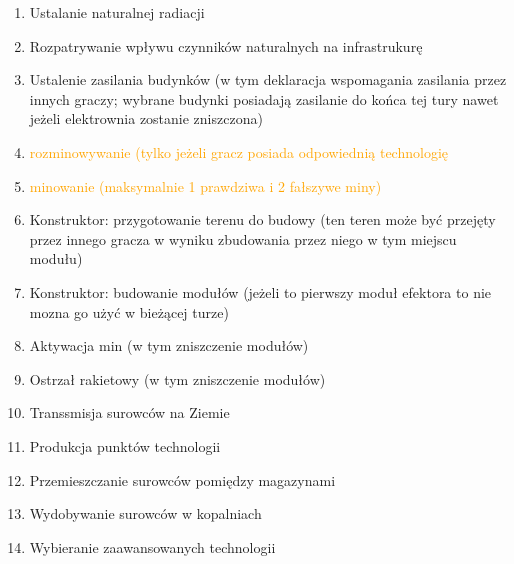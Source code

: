 \documentclass[11pt,a4paper]{article}
\begin{document}
\begin{enumerate}
  \setlength{\parskip}{0pt}
  \setlength{\itemsep}{0pt plus 1pt}
\item Ustalanie naturalnej radiacji
\item Rozpatrywanie wpływu czynników naturalnych na infrastrukurę
\item Ustalenie zasilania budynków (w tym deklaracja wspomagania zasilania przez innych graczy; wybrane budynki posiadają zasilanie do końca tej tury nawet jeżeli elektrownia zostanie zniszczona)
\item \textcolor{orange}{rozminowywanie (tylko jeżeli gracz posiada odpowiednią technologię}
\item \textcolor{orange}{minowanie (maksymalnie 1 prawdziwa i 2 fałszywe miny)}
\item Konstruktor: przygotowanie terenu do budowy (ten teren może być przejęty przez innego gracza w wyniku zbudowania przez niego w tym miejscu modułu)
\item Konstruktor: budowanie modułów (jeżeli to pierwszy moduł efektora to nie mozna go użyć w bieżącej turze)
\item Aktywacja min (w tym zniszczenie modułów)
\item Ostrzał rakietowy (w tym zniszczenie modułów)
\item Transsmisja surowców na Ziemie
\item Produkcja punktów technologii
\item Przemieszczanie surowców pomiędzy magazynami
\item Wydobywanie surowców w kopalniach
\item Wybieranie zaawansowanych technologii
\end{enumerate}
\end{document}

